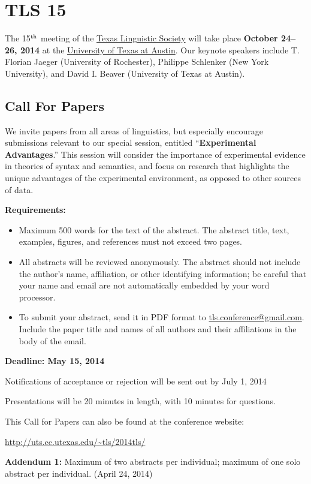 \documentclass[11pt]{article}
\begin{document}
\clearpage\thispagestyle{empty}

\section*{TLS 15}

The 15$^{\rm th}$ meeting of the \href{http://uts.cc.utexas.edu/~tls}{Texas Linguistic Society} will take place \textbf{October 24--26, 2014} at the \href{https://www.utexas.edu/cola/depts/linguistics/}{University of Texas at Austin}. Our keynote speakers include T. Florian Jaeger (University of Rochester), Philippe Schlenker (New York University), and David I. Beaver (University of Texas at Austin).

\subsection*{Call For Papers}

We invite papers from all areas of linguistics, but especially encourage submissions relevant to our special session, entitled ``\textbf{Experimental Advantages}.''
This session will consider the importance of experimental evidence in theories of syntax and semantics, and focus on research that highlights the unique advantages of the experimental environment, as opposed to other sources of data.

\bigskip\noindent
\textbf{Requirements:}

\begin{itemize}
  \item Maximum 500 words for the text of the abstract. The abstract title, text, examples, figures, and references must not exceed two pages.
  \item All abstracts will be reviewed anonymously. The abstract should not include the author’s name, affiliation, or other identifying information; be careful that your name and email are not automatically embedded by your word processor.
  \item To submit your abstract, send it in PDF format to \href{mailto:tls.conference@gmail.com}{tls.conference@gmail.com}. Include the paper title and names of all authors and their affiliations in the body of the email.
\end{itemize}

\textbf{Deadline: May 15, 2014}

\bigskip\noindent
Notifications of acceptance or rejection will be sent out by July 1, 2014

\medskip\noindent
Presentations will be 20 minutes in length, with 10 minutes for questions.

\medskip\noindent
This Call for Papers can also be found at the conference website:

\medskip
\url{http://uts.cc.utexas.edu/~tls/2014tls/}

\bigskip\noindent
\textbf{Addendum 1:} Maximum of two abstracts per individual; maximum of one solo abstract per individual.
(April 24, 2014)
\end{document}
